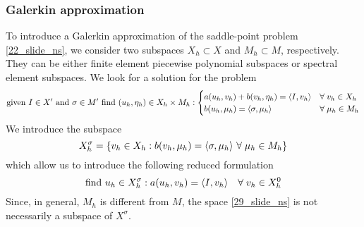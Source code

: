 \subsubsection*{Galerkin approximation}
To introduce a Galerkin approximation of the saddle-point problem \eqref{22_slide_ns}, we consider two subspaces \(X_h \subset X\) and \(M_h \subset M\), respectively. They can be either finite element piecewise polynomial subspaces or spectral element subspaces.
We look for a solution for the problem 
\begin{equation}
    \text{given } I \in X' \text{ and } \sigma \in M' \ \text{find } (u_h, \eta_h) \in X_h \times M_h :
    \begin{cases}
        a(u_h, v_h) + b(v_h, \eta_h) = \langle I,v_h \rangle & \forall \; v_h \in X_h \\
        b(u_h, \mu_h) = \langle \sigma,\mu_h \rangle & \forall \; \mu_h \in M_h
    \end{cases}
    \label{28_slide_ns}
\end{equation}
We introduce the subspace 
\begin{equation}
    X^\sigma_h =\left\{ v_h \in X_h : b(v_h, \mu_h) = \langle \sigma,\mu_h \rangle \ \forall \; \mu_h \in M_h \right\}
    \label{29_slide_ns}
\end{equation}
which allow us to introduce the following reduced formulation 
\begin{equation}
    \text{find } u_h \in X_h^\sigma : a(u_h, v_h) = \langle I,v_h \rangle \quad \forall \; v_h \in X_h^0
    \label{30_slide_ns}
\end{equation}
Since, in general, \(M_h\) is different from \(M\), the space \eqref{29_slide_ns} is not necessarily a subspace of \(X^\sigma\). 

